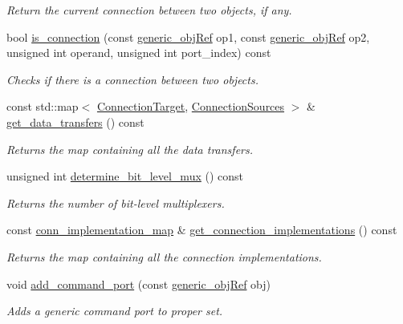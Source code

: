 \begin{DoxyCompactItemize}
\begin{DoxyCompactList}\small\item\em Return the current connection between two objects, if any. \end{DoxyCompactList}\item 
bool \hyperlink{classconn__binding_a01c01d9417e2ec21be4329bae19336ae}{is\+\_\+connection} (const \hyperlink{generic__obj_8hpp_acb533b2ef8e0fe72e09a04d20904ca81}{generic\+\_\+obj\+Ref} op1, const \hyperlink{generic__obj_8hpp_acb533b2ef8e0fe72e09a04d20904ca81}{generic\+\_\+obj\+Ref} op2, unsigned int operand, unsigned int port\+\_\+index) const
\begin{DoxyCompactList}\small\item\em Checks if there is a connection between two objects. \end{DoxyCompactList}\item 
const std\+::map$<$ \hyperlink{structconn__binding_1_1ConnectionTarget}{Connection\+Target}, \hyperlink{classconn__binding_aa5406c3bf4cee893234c2b0847471f56}{Connection\+Sources} $>$ \& \hyperlink{classconn__binding_a3d80a579f44ae487ed5419b560ad5d26}{get\+\_\+data\+\_\+transfers} () const
\begin{DoxyCompactList}\small\item\em Returns the map containing all the data transfers. \end{DoxyCompactList}\item 
unsigned int \hyperlink{classconn__binding_a6caea0ccfc30f9ef2d3a1a6452f08cb3}{determine\+\_\+bit\+\_\+level\+\_\+mux} () const
\begin{DoxyCompactList}\small\item\em Returns the number of bit-\/level multiplexers. \end{DoxyCompactList}\item 
const \hyperlink{classconn__binding_a352bfe56b0a7f7b3c9763bf90c87f785}{conn\+\_\+implementation\+\_\+map} \& \hyperlink{classconn__binding_ad5bc96e38fd8c49069bea634be25e3b0}{get\+\_\+connection\+\_\+implementations} () const
\begin{DoxyCompactList}\small\item\em Returns the map containing all the connection implementations. \end{DoxyCompactList}\item 
void \hyperlink{classconn__binding_a31cfcf41327aa36e1c1db32f175ef001}{add\+\_\+command\+\_\+port} (const \hyperlink{generic__obj_8hpp_acb533b2ef8e0fe72e09a04d20904ca81}{generic\+\_\+obj\+Ref} obj)
\begin{DoxyCompactList}\small\item\em Adds a generic command port to proper set. \end{DoxyCompactList}\item 

\end{DoxyCompactItemize}

